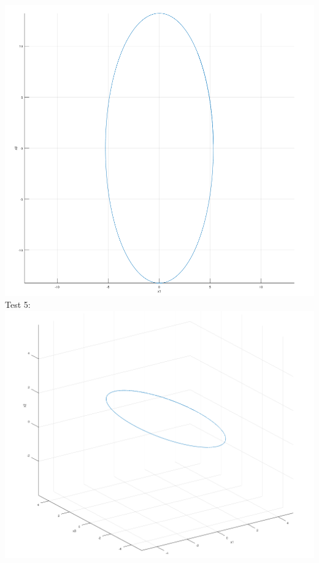 \documentclass[12pt, letterpaper, twoside]{article}    %
\begin{document}
\includegraphics[width=\textwidth]{test42}
\newpage
Test 5: \\
\includegraphics[width=\textwidth]{test51}
\end{document}
